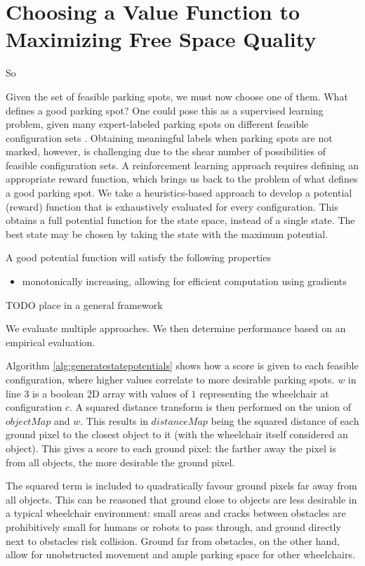 \section{Choosing a Value Function to Maximizing Free Space Quality}
\label{sec:choosingparkingspot}

So

Given the set of feasible parking spots, we must now choose one of them. What
defines a good parking spot? One could pose this as a supervised learning
problem, given many expert-labeled parking spots on different feasible
configuration sets \cite{wu2006parking, true2007vacant}. 
Obtaining meaningful labels when parking spots are not marked, however, is
challenging due to the shear number of possibilities of feasible configuration
sets. A reinforcement learning approach requires defining an appropriate reward
function, which brings us back to the problem of what defines a good parking
spot. We take a heuristics-based approach to develop a potential (reward)
function that is exhaustively evaluated for every configuration. This obtains a
full potential function for the state space, instead of a single state. The best
state may be chosen by taking the state with the maximum potential.

A good potential function will satisfy the following properties
\begin{itemize}
\item monotonically increasing, allowing for efficient computation
using gradients
\end{itemize}

TODO place in a general framework

We evaluate multiple approaches. We then determine performance based on an
empirical evaluation.

Algorithm \autoref{alg:generatestatepotentials} shows how a score is given to each
feasible configuration, where higher values correlate to more desirable parking
spots. $w$ in line 3 is a boolean 2D array with values of $1$ representing the
wheelchair at configuration $c$. A squared distance transform is then performed
on the union of $objectMap$ and $w$. This results in $distanceMap$ being the
squared distance of each ground pixel to the closest object to it (with the
wheelchair itself considered an object). This gives a score to each ground pixel:
the farther away the pixel is from all objects, the more desirable the ground
pixel. 

The squared term is included to quadratically favour ground pixels far
away from all objects. This can be reasoned that ground close to objects are less
desirable in a typical wheelchair environment: small areas and cracks between
obstacles are prohibitively small for humans or robots to pass through, and
ground directly next to obstacles risk collision. Ground far from obstacles, on
the other hand, allow for unobstructed movement and ample parking space for
other wheelchairs.

